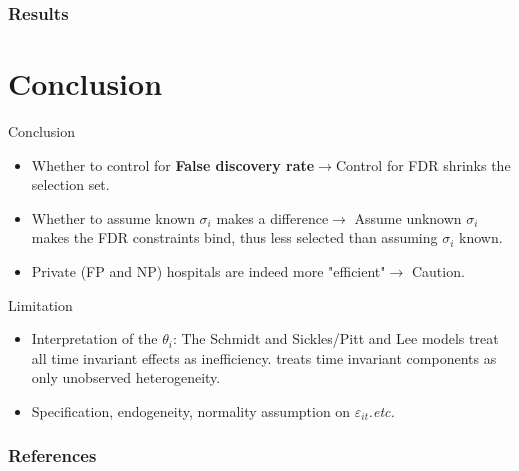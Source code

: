 \documentclass[10pt,mathserif,aspectratio=169]{beamer}
\begin{document}
\begin{frame}
  \frametitle{Results}
  \begin{table}\fontsize{6pt}{6pt}\selectfont
    
  \end{table}
\end{frame}

\section{Conclusion}

\begin{frame}{Conclusion}
  \begin{itemize}
    \item Whether to control for \textbf{False discovery rate}$\to$Control for FDR
          shrinks the selection set.
    \item Whether to assume known $\sigma_i$ makes a difference$\to$ Assume unknown
          $\sigma_i$ makes the FDR constraints bind, thus less selected than assuming
          $\sigma_i$ known.
    \item Private (FP and NP) hospitals are indeed more "efficient"$\to$ Caution.
  \end{itemize}
\end{frame}

\begin{frame}[label=limitation]{Limitation}
  \begin{itemize}\itemsep=12pt
    \item Interpretation of the $\theta_i$: The Schmidt and Sickles/Pitt and Lee models
          treat all time invariant effects as inefficiency. \citet{greene2005fixed}
          treats time invariant components as only unobserved heterogeneity.
    \item Specification, endogeneity, normality assumption on
          $\varepsilon_{it}$.\textit{etc.} \hyperlink{normality}{} \end{itemize}
\end{frame}

\begin{frame}[allowframebreaks]
  \frametitle{References}
  
  
\end{frame}

\appendix
\end{document}
